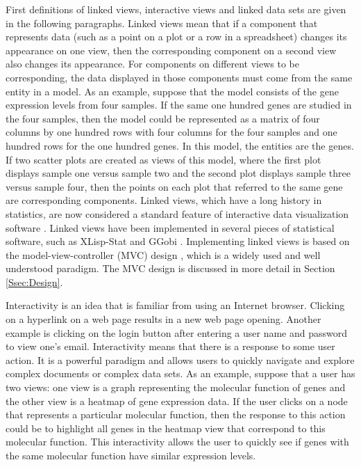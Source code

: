 \documentclass{article}[11pt]
\begin{document}
First definitions of linked views, interactive views and linked data
sets are given in the following paragraphs.  Linked views mean that if a
component that represents data (such as a point on a plot or a row in a
spreadsheet) changes its appearance on one view, then the corresponding
component on a second view also changes its appearance.  For components on
different views to be corresponding, the data displayed in those components
must come from the same entity in a model.  As an example, suppose that the
model consists of the gene expression levels from four samples.  If the same
one hundred genes are studied in the four samples, then the model could be
represented as a matrix of four columns by one hundred rows with four columns
for the four samples and one hundred rows for the one hundred genes.  In this
model, the entities are the genes.  If two scatter plots are created as views
of this model, where the first plot displays sample one versus sample two and
the second plot displays sample three versus sample four, then the points on
each plot that referred to the same gene are corresponding components.  Linked
views, which have a long history in statistics, are now considered a standard
feature of interactive data visualization software \cite{GGobi}.  Linked views
have been implemented in several pieces of statistical software, such as
XLisp-Stat \cite{Lisp} and GGobi \cite{GGobiMan}.  Implementing linked views
is based on the model-view-controller (MVC) design \cite{DesignPatterns},
which is a widely used and well understood paradigm.  The MVC design is
discussed in more detail in Section \ref{Ssec:Design}.

Interactivity is an idea that is familiar from using an Internet browser.
Clicking on a hyperlink on a web page results in a new web page
opening.  Another example is clicking on the login button after entering a
user name and password to view one's email.  Interactivity means that there is
a response to some user action.  It is a powerful paradigm and allows users to
quickly navigate and explore complex documents or complex data sets.  As an
example, suppose that a user has two views: one view is a graph representing
the molecular function of genes and the other view is a heatmap of gene
expression data.  If the user clicks on a node that represents a particular
molecular function, then the response to this action could be to highlight all
genes in the heatmap view that correspond to this molecular function.  This
interactivity allows the user to quickly see if genes with the same molecular
function have similar expression levels. 
\end{document}
